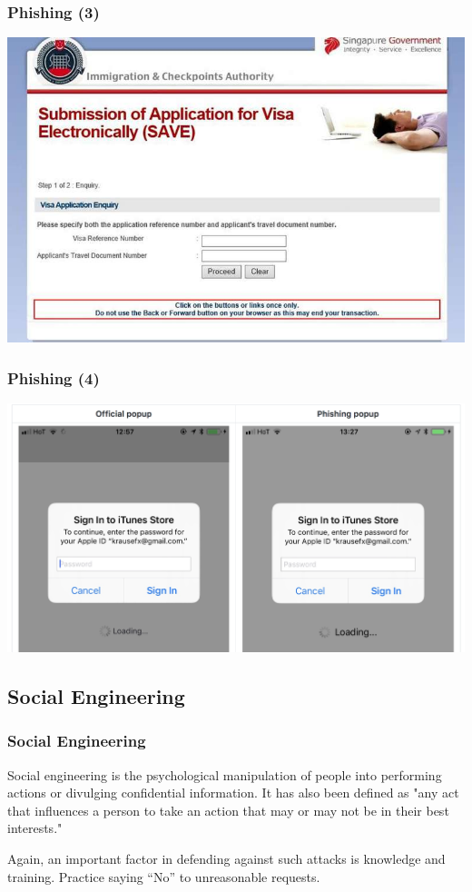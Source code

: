 \documentclass[aspectratio=1610,dvipsnames]{beamer}
\begin{document}
\begin{frame}
\frametitle{Phishing (3)}
\begin{center}
\includegraphics[scale=0.375]{images/phishing_gov} 
\end{center}
\end{frame}

\begin{frame}
\frametitle{Phishing (4)}
\begin{center}
\includegraphics[scale=0.175]{images/phishing_apple.png} 
\end{center}
\end{frame}

\subsection{Social Engineering}

\begin{frame}
\frametitle{Social Engineering}
Social engineering is the psychological manipulation of people into performing actions or divulging confidential information. It has also been defined as "any act that influences a person to take an action that may or may not be in their best interests."
\pause\bigskip

Again, an important factor in defending against such attacks is knowledge and training. Practice saying ``No'' to unreasonable requests.
\end{frame}
\end{document}
